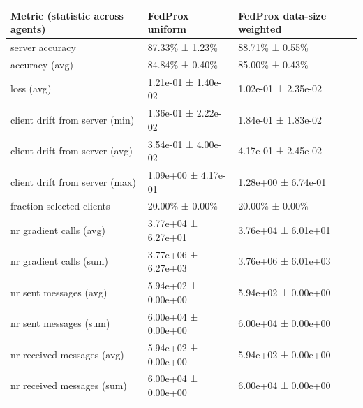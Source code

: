 \begin{tabular}{lll}
\hline
 Metric (statistic across agents)   & FedProx uniform     & FedProx data-size weighted   \\
\hline
 server accuracy                    & 87.33\% ± 1.23\%      & 88.71\% ± 0.55\%               \\
 accuracy (avg)                     & 84.84\% ± 0.40\%      & 85.00\% ± 0.43\%               \\
 loss (avg)                         & 1.21e-01 ± 1.40e-02 & 1.02e-01 ± 2.35e-02          \\
 client drift from server (min)     & 1.36e-01 ± 2.22e-02 & 1.84e-01 ± 1.83e-02          \\
 client drift from server (avg)     & 3.54e-01 ± 4.00e-02 & 4.17e-01 ± 2.45e-02          \\
 client drift from server (max)     & 1.09e+00 ± 4.17e-01 & 1.28e+00 ± 6.74e-01          \\
 fraction selected clients          & 20.00\% ± 0.00\%      & 20.00\% ± 0.00\%               \\
 nr gradient calls (avg)            & 3.77e+04 ± 6.27e+01 & 3.76e+04 ± 6.01e+01          \\
 nr gradient calls (sum)            & 3.77e+06 ± 6.27e+03 & 3.76e+06 ± 6.01e+03          \\
 nr sent messages (avg)             & 5.94e+02 ± 0.00e+00 & 5.94e+02 ± 0.00e+00          \\
 nr sent messages (sum)             & 6.00e+04 ± 0.00e+00 & 6.00e+04 ± 0.00e+00          \\
 nr received messages (avg)         & 5.94e+02 ± 0.00e+00 & 5.94e+02 ± 0.00e+00          \\
 nr received messages (sum)         & 6.00e+04 ± 0.00e+00 & 6.00e+04 ± 0.00e+00          \\
\hline
\end{tabular}